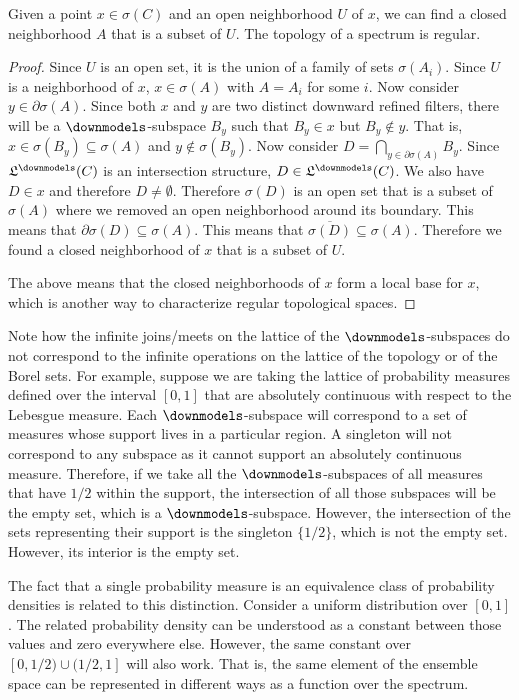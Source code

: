 \begin{conj}
	Given a point $x \in \sigma(C)$ and an open neighborhood $U$ of $x$, we can find a closed neighborhood $A$ that is a subset of $U$. The topology of a spectrum is regular.
\end{conj}

\begin{proof}
	Since $U$ is an open set, it is the union of a family of sets $\sigma(A_i)$. Since $U$ is a neighborhood of $x$, $x \in \sigma(A)$ with $A = A_i$ for some $i$. Now consider $y \in \partial \sigma(A)$. Since both $x$ and $y$ are two distinct downward refined filters, there will be a $\separate$-subspace $B_y$ such that $B_y \in x$ but $B_y \notin y$. That is, $x \in \sigma(B_y) \subseteq \sigma(A)$ and $y \notin \sigma(B_y)$. Now consider $D = \bigcap_{y \in \partial \sigma(A)} B_y$. Since $\mathfrak{L}^\separate(C)$ is an intersection structure, $D \in \mathfrak{L}^\separate(C)$. We also have $D \in x$ and therefore $D \neq \emptyset$. Therefore $\sigma(D)$ is an open set that is a subset of $\sigma(A)$ where we removed an open neighborhood around its boundary. This means that $\partial \sigma(D) \subseteq \sigma(A)$. This means that $\overline{\sigma(D)} \subseteq \sigma(A)$. Therefore we found a closed neighborhood of $x$ that is a subset of $U$.
	
	The above means that the closed neighborhoods of $x$ form a local base for $x$, which is another way to characterize regular topological spaces.
\end{proof}

\begin{mathSection}
	\begin{remark}
		Note how the infinite joins/meets on the lattice of the $\separate$-subspaces do not correspond to the infinite operations on the lattice of the topology or of the Borel sets. For example, suppose we are taking the lattice of probability measures defined over the interval $[0,1]$ that are absolutely continuous with respect to the Lebesgue measure. Each $\separate$-subspace will correspond to a set of measures whose support lives in a particular region. A singleton will not correspond to any subspace as it cannot support an absolutely continuous measure. Therefore, if we take all the $\separate$-subspaces of all measures that have $1/2$ within the support, the intersection of all those subspaces will be the empty set, which is a $\separate$-subspace. However, the intersection of the sets representing their support is the singleton $\{1/2\}$, which is not the empty set. However, its interior is the empty set.
		
		The fact that a single probability measure is an equivalence class of probability densities is related to this distinction. Consider a uniform distribution over $[0,1]$. The related probability density can be understood as a constant between those values and zero everywhere else. However, the same constant over $[0,1/2) \cup (1/2,1]$ will also work. That is, the same element of the ensemble space can be represented in different ways as a function over the spectrum.
	\end{remark}
\end{mathSection}

